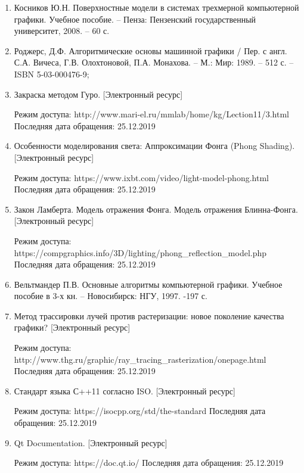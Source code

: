 \documentclass[12pt]{report}
\begin{document}
	\begin{enumerate}
		\item Косников Ю.Н. Поверхностные модели в системах трехмерной компьютерной графики. Учебное пособие. – Пенза: Пензенский государственный университет, 2008. – 60 с.
		
		\item Роджерс, Д.Ф. Алгоритмические основы машинной графики / Пер. с англ.
		С.А. Вичеса, Г.В. Олохтоновой, П.А. Монахова. – М.: Мир: 1989. – 512 с.
		– ISBN 5-03-000476-9;
		
		\item Закраска методом Гуро. [Электронный ресурс]
		
		 Режим доступа: http://www.mari-el.ru/mmlab/home/kg/Lection11/3.html Последняя дата обращения: 25.12.2019
		
		\item Особенности моделирования света: Аппроксимации Фонга (Phong Shading). [Электронный ресурс] 
		
		Режим доступа: https://www.ixbt.com/video/light-model-phong.html Последняя дата обращения: 25.12.2019
		
		\item Закон Ламберта. Модель отражения Фонга. Модель отражения Блинна-Фонга.
		[Электронный ресурс] 
		
		Режим доступа: https://compgraphics.info/3D/lighting/phong\_reflection\_model.php Последняя дата обращения: 25.12.2019
		
		\item Вельтмандер П.В. Основные алгоритмы компьютерной графики. Учебное пособие в 3-х кн. – Новосибирск: НГУ, 1997. -197 с.
		
		\item Метод трассировки лучей против растеризации: новое поколение качества графики?
		[Электронный ресурс] 
		
		Режим доступа: http://www.thg.ru/graphic/ray\_tracing\_rasterization/onepage.html Последняя дата обращения: 25.12.2019
				
		\item Стандарт языка С++11 согласно ISO.
		[Электронный ресурс] 
		
		Режим доступа: https://isocpp.org/std/the-standard Последняя дата обращения: 25.12.2019
				
		\item Qt Documentation.
		[Электронный ресурс] 
		
		Режим доступа: https://doc.qt.io/ Последняя дата обращения: 25.12.2019
				

\end{enumerate}
\end{document}
